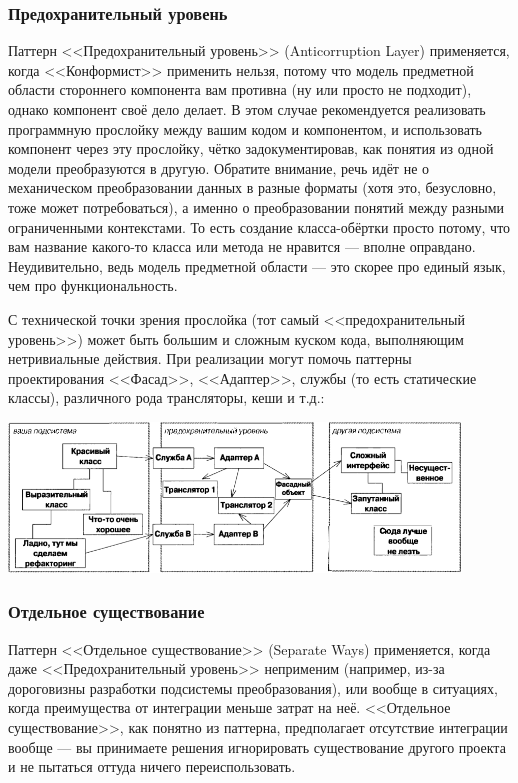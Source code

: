 \documentclass{../../text-style}
\begin{document}
\subsubsection{Предохранительный уровень}

Паттерн <<Предохранительный уровень>> (Anticorruption Layer) применяется, когда <<Конформист>> применить нельзя, потому что модель предметной области стороннего компонента вам противна (ну или просто не подходит), однако компонент своё дело делает. В этом случае рекомендуется реализовать программную прослойку между вашим кодом и компонентом, и использовать компонент через эту прослойку, чётко задокументировав, как понятия из одной модели преобразуются в другую. Обратите внимание, речь идёт не о механическом преобразовании данных в разные форматы (хотя это, безусловно, тоже может потребоваться), а именно о преобразовании понятий между разными ограниченными контекстами. То есть создание класса-обёртки просто потому, что вам название какого-то класса или метода не нравится --- вполне оправдано. Неудивительно, ведь модель предметной области --- это скорее про единый язык, чем про функциональность.

С технической точки зрения прослойка (тот самый <<предохранительный уровень>>) может быть большим и сложным куском кода, выполняющим нетривиальные действия. При реализации могут помочь паттерны проектирования <<Фасад>>, <<Адаптер>>, службы (то есть статические классы), различного рода трансляторы, кеши и т.д.:

\begin{center}
    \includegraphics[width=0.9\textwidth]{anticorruptionLayer.png}
\end{center}

\subsubsection{Отдельное существование}

Паттерн <<Отдельное существование>> (Separate Ways) применяется, когда даже <<Предохранительный уровень>> неприменим (например, из-за дороговизны разработки подсистемы преобразования), или вообще в ситуациях, когда преимущества от интеграции меньше затрат на неё. <<Отдельное существование>>, как понятно из паттерна, предполагает отсутствие интеграции вообще --- вы принимаете решения игнорировать существование другого проекта и не пытаться оттуда ничего переиспользовать. 
\end{document}
